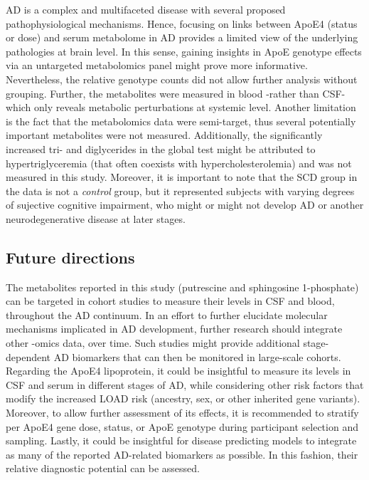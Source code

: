 \documentclass{amsart}
\begin{document}
AD is a complex and multifaceted disease with several proposed pathophysiological mechanisms. Hence, focusing on links between ApoE4 (status or dose) and serum metabolome in AD provides a limited view of the underlying pathologies at brain level. In this sense, gaining insights in ApoE genotype effects via an untargeted metabolomics panel might prove more informative. Nevertheless, the relative genotype counts did not allow further analysis without grouping. Further, the metabolites were measured in blood -rather than CSF- which only reveals metabolic perturbations at systemic level. Another limitation is the fact that the metabolomics data were semi-target, thus several potentially important metabolites were not measured. Additionally, the significantly increased tri- and diglycerides in the global test might be attributed to hypertriglyceremia (that often coexists with hypercholesterolemia) and was not measured in this study. Moreover, it is important to note that the SCD group in the data is not a \textit{control} group, but it represented subjects with varying degrees of sujective cognitive impairment, who might or  might not develop AD or another neurodegenerative disease at later stages.

\subsection{Future directions}
The metabolites reported in this study (putrescine and sphingosine 1-phosphate) can be targeted in cohort studies to measure their levels in CSF and blood, throughout the AD continuum. In an effort to further elucidate molecular mechanisms implicated in AD development, further research should integrate other -omics data, over time. Such studies might provide additional stage-dependent AD biomarkers that can then be monitored in large-scale cohorts. Regarding the ApoE4 lipoprotein, it could be insightful to measure its levels in CSF and serum in different stages of AD, while considering other risk factors that modify the increased LOAD risk (ancestry, sex, or other inherited gene variants). Moreover, to allow further assessment of its effects, it is recommended to stratify per ApoE4 gene dose, status, or ApoE genotype during participant selection and sampling. Lastly, it could be insightful for disease predicting models to integrate as many of the reported AD-related biomarkers as possible. In this fashion, their relative diagnostic potential can be assessed.
\end{document}
